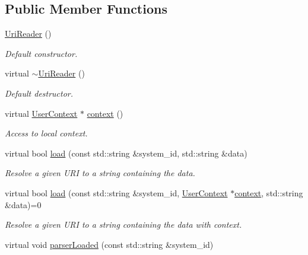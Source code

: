 \subsection*{Public Member Functions}
\begin{DoxyCompactItemize}
\item 
\hyperlink{class_d_d4hep_1_1_x_m_l_1_1_uri_reader_a9e7b119a191640572c3cdf2b8c3e3023}{Uri\+Reader} ()
\begin{DoxyCompactList}\small\item\em Default constructor. \end{DoxyCompactList}\item 
virtual \hyperlink{class_d_d4hep_1_1_x_m_l_1_1_uri_reader_af8a3cc8ac2e0a5c0f2ea45c3894a2582}{$\sim$\+Uri\+Reader} ()
\begin{DoxyCompactList}\small\item\em Default destructor. \end{DoxyCompactList}\item 
virtual \hyperlink{struct_d_d4hep_1_1_x_m_l_1_1_uri_reader_1_1_user_context}{User\+Context} $\ast$ \hyperlink{class_d_d4hep_1_1_x_m_l_1_1_uri_reader_a9f8d06469b3e5bf1e69c72c4285dfcac}{context} ()
\begin{DoxyCompactList}\small\item\em Access to local context. \end{DoxyCompactList}\item 
virtual bool \hyperlink{class_d_d4hep_1_1_x_m_l_1_1_uri_reader_a4cb644360608b580a1aaa4ccb9a8c7fa}{load} (const std\+::string \&system\+\_\+id, std\+::string \&data)
\begin{DoxyCompactList}\small\item\em Resolve a given U\+RI to a string containing the data. \end{DoxyCompactList}\item 
virtual bool \hyperlink{class_d_d4hep_1_1_x_m_l_1_1_uri_reader_a80a35ded7f30ba3b1954edb0e0493d6f}{load} (const std\+::string \&system\+\_\+id, \hyperlink{struct_d_d4hep_1_1_x_m_l_1_1_uri_reader_1_1_user_context}{User\+Context} $\ast$\hyperlink{class_d_d4hep_1_1_x_m_l_1_1_uri_reader_a9f8d06469b3e5bf1e69c72c4285dfcac}{context}, std\+::string \&data)=0
\begin{DoxyCompactList}\small\item\em Resolve a given U\+RI to a string containing the data with context. \end{DoxyCompactList}\item 
virtual void \hyperlink{class_d_d4hep_1_1_x_m_l_1_1_uri_reader_a58d5ece4bc5ee3b5d1d8f9eac85baecd}{parser\+Loaded} (const std\+::string \&system\+\_\+id)

\end{DoxyCompactItemize}

